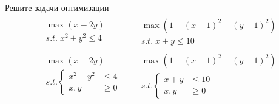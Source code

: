 \begin{exercise}
Решите задачи оптимизации
\begin{align*}
	& \begin{gathered}
		\max (x-2y) \\ s.t.\; x^2+y^2\leq 4
	\end{gathered} &
	& \begin{gathered}
		\max(1-(x+1)^2-(y-1)^2) \\ s.t.\; x+y\leq 10
	\end{gathered} \\
	& \begin{gathered}
		\max (x-2y) \\ s.t.\left\{\begin{aligned}
			 x^2+y^2&\leq 4 \\  x,y&\geq0
		\end{aligned}\right.
	\end{gathered} &
	& \begin{gathered}
		\max(1-(x+1)^2-(y-1)^2) \\ s.t.\left\{\begin{aligned}
			x+y&\leq 10  \\  x,y&\geq0
		\end{aligned}\right.
	\end{gathered}
\end{align*}
\end{exercise}





